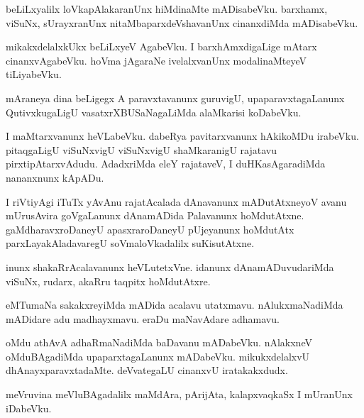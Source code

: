 \documentclass{article}
\begin{document}
\begin{mn}
beLiLxyalilx  loVkapAlakaranUnx  hiMdinaMte  mADisabeVku.  barxhamx,  viSuNx,  sUrayxranUnx  
nitaMbaparxdeVshavanUnx  cinanxdiMda  mADisabeVku.
\end{mn}

\begin{mn}
mikakxdelalxkUkx  beLiLxyeV  AgabeVku.  I  barxhAmxdigaLige  mAtarx  cinanxvAgabeVku.  
hoVma  jAgaraNe  ivelalxvanUnx  modalinaMteyeV  tiLiyabeVku.
\end{mn}

\begin{mn}
mAraneya  dina  beLigegx  A  paravxtavanunx  guruvigU,  upaparavxtagaLanunx  QutivxkugaLigU  
vasatxrXBUSaNagaLiMda  alaMkarisi  koDabeVku.  
\end{mn}

\begin{mn}
I  maMtarxvanunx  heVLabeVku.  dabeRya  pavitarxvanunx  hAkikoMDu  irabeVku.  pitaqgaLigU  
viSuNxvigU  viSuNxvigU  shaMkaranigU  rajatavu  pirxtipAtarxvAdudu.  AdadxriMda  eleY  
rajataveV,  I  duHKasAgaradiMda  nananxnunx  kApADu.
\end{mn}

\begin{mn}
I  riVtiyAgi  iTuTx  yAvAnu  rajatAcalada  dAnavanunx  mADutAtxneyoV  avanu  mUrusAvira  
goVgaLanunx  dAnamADida  Palavanunx  hoMdutAtxne.  gaMdharavxroDaneyU  apasxraroDaneyU  
pUjeyanunx  hoMdutAtx  parxLayakAladavaregU  soVmaloVkadalilx  suKisutAtxne.
\end{mn}

\begin{mn}
inunx  shakaRrAcalavanunx  heVLutetxVne.  idanunx  dAnamADuvudariMda  viSuNx,  
rudarx,  akaRru  taqpitx hoMdutAtxre. 
\end{mn}

\begin{mn}
eMTumaNa  sakakxreyiMda  mADida  acalavu  utatxmavu.  nAlukxmaNadiMda  mADidare  
adu  madhayxmavu.  eraDu  maNavAdare  adhamavu.
\end{mn}

\begin{mn}
oMdu  athAvA  adhaRmaNadiMda  baDavanu  mADabeVku.  nAlakxneV  oMduBAgadiMda  upaparxtagaLanunx  
mADabeVku.  mikukxdelalxvU  dhAnayxparavxtadaMte.  deVvategaLU  cinanxvU  iratakakxdudx.
\end{mn}

\begin{mn}
meVruvina  meVluBAgadalilx  maMdAra,  pArijAta,  kalapxvaqkaSx  I  mUranUnx  iDabeVku.
\end{mn}
\end{document}
